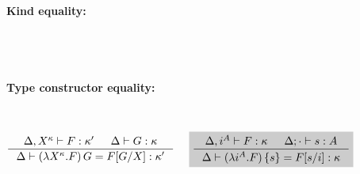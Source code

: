 \begin{figure}
\paragraph{Kind equality:} ~~ 
 \qquad{}
~\\~\\
\paragraph{Type constructor equality:} ~~ 
\[ \inference{\Delta,X^\kappa |- F:\kappa' & \Delta |- G:\kappa}
             {\Delta |- (\lambda X^\kappa.F)\,G = F[G/X]:\kappa'}
 ~~~~ \newFi{
   \inference{\Delta,i^A |- F:\kappa & \Delta;\cdot |- s:A}
             {\Delta |- (\lambda i^A.F)\,\{s\} = F[s/i]:\kappa} }
\]

\end{figure}
